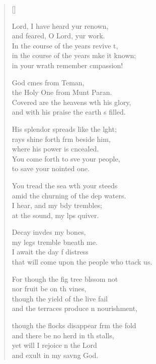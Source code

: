 \settowidth{\versewidth}{that will come upon the people who attack us.}
\begin{verse}[\versewidth]
  \begin{patverse}
 Lord, I have heard yur renown,\Med\\
and feared, O Lord, yur work.\\
In the course of the years revive \pointup{\i}t,\Flex\\
in the course of the years mke it known;\Med\\
in your wrath remember cmpassion!

God cmes from Teman,\Med\\
the Holy One from Munt Paran.\\
Covered are the heavens w\pointup{\i}th his glory,\Med\\
and with his praise the earth \pointup{\i}s filled.

His splendor spreads like the l\pointup{\i}ght;\Flex\\
rays shine forth frm beside him,\Med\\
where his power is cncealed.\\
You come forth to sve your people,\Med\\
to save your nointed one.

You tread the sea w\pointup{\i}th your steeds\Med\\
amid the churning of the dep waters.\\
I hear, and my bdy trembles;\Med\\
at the sound, my l\pointup{\i}ps quiver.

Decay invdes my bones,\Med\\
my legs tremble bneath me.\\
I await the day f distress\Med\\
that will come upon the people who ttack us.

For though the fig tree blssom not\Med\\
nor fruit be on th vines,\\
though the yield of the live fail\Med\\
and the terraces produce n nourishment,

though the flocks disappear frm the fold\Med\\
and there be no herd in th stalls,\\
yet will I rejoice \pointup{\i}n the Lord\Med\\
and exult in my sav\pointup{\i}ng God.


\end{patverse}
\end{verse}

